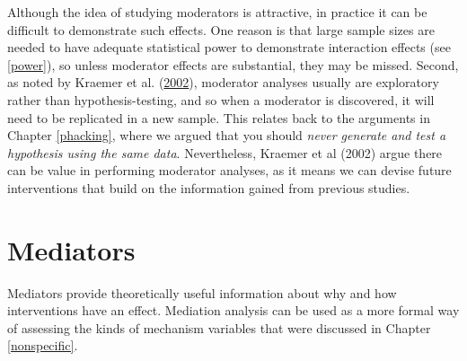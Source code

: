 \documentclass{krantz}
\begin{document}
Although the idea of studying moderators is attractive, in practice it can be difficult to demonstrate such effects. One reason is that large sample sizes are needed to have adequate statistical power to demonstrate interaction effects (see \ref{power}), so unless moderator effects are substantial, they may be missed. Second, as noted by Kraemer et al. (\protect\hyperlink{ref-kraemer2002}{2002}), moderator analyses usually are exploratory rather than hypothesis-testing, and so when a moderator is discovered, it will need to be replicated in a new sample. This relates back to the arguments in Chapter \ref{phacking}, where we argued that you should \emph{never generate and test a hypothesis using the same data}. Nevertheless, Kraemer et al (2002) argue there can be value in performing moderator analyses, as it means we can devise future interventions that build on the information gained from previous studies.

\hypertarget{mediators-1}{%
\section{Mediators}\label{mediators-1}}

Mediators provide theoretically useful information about why and how interventions have an effect. Mediation analysis can be used as a more formal way of assessing the kinds of mechanism variables that were discussed in Chapter \ref{nonspecific}.
\end{document}
